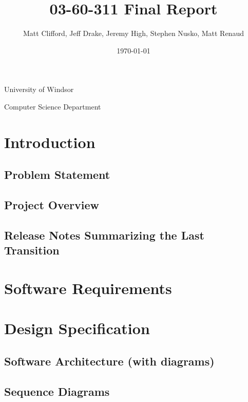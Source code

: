 \documentclass[11pt]{article}
\title{03-60-311 Final Report}
\author{Matt Clifford, Jeff Drake, Jeremy High, Stephen Nusko, Matt Renaud}
\date{\today}
\begin{document}
\maketitle

\vspace{1.5in}

\begin{center}
  University of Windsor

  Computer Science Department
\end{center}

\newpage
\setcounter{tocdepth}{3}
\tableofcontents
\vspace*{1cm}

\section{Introduction}
\label{sec-introduction}

\subsection{Problem Statement}
\label{sec-prodlem-statement}

\subsection{Project Overview}
\label{sec-project-overview}

\subsection{Release Notes Summarizing the Last Transition}
\label{sec-release-notes}

\section{Software Requirements}
\label{sec-software-reqs}

\section{Design Specification}
\label{sec-design-specs}

\subsection{Software Architecture (with diagrams)}
\label{sec-software-architecture}

\subsection{Sequence Diagrams}
\label{sec-sequence-diagrams}
\end{document}

